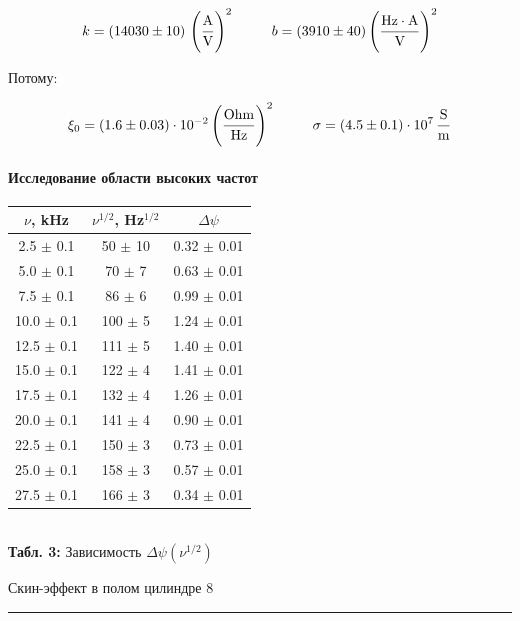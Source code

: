 \documentclass[12pt,a4paper]{scrartcl}
\begin{document}
	$$k = (14030 \pm 10)\, \left(\dfrac{\strut \text{A}}{\strut \text{V}}\right)^2 \ \ \ \ \ \ \ \ b = (3910 \pm 40) \left(\dfrac{\strut \text{Hz} \cdot \text{A}}{\strut \text{V}}\right)^2$$
	
	Потому:
	
	$$\xi_0 = (1.6 \pm 0.03) \cdot 10^{-2} \left(\dfrac{\strut \text{Ohm}}{\strut \text{Hz}}\right)^2 \ \ \ \ \ \ \ \ \sigma = (4.5 \pm 0.1) \cdot 10^7\,\dfrac{\strut \text{S}}{\strut \text{m}}$$
	
	
	\paragraph{Исследование области высоких частот} \hfill
	
	\begin{center}
		\begin{tabular}{|c|c|c|}
			\hline
			$\nu$, kHz & $\nu^{1/2}$, Hz$^{1/2}$ & $\Delta \psi$
			\\\hline
			2.5 $\pm$ 0.1 & 50 $\pm$ 10 & 0.32 $\pm$ 0.01
			\\\hline
			5.0 $\pm$ 0.1 & 70 $\pm$ 7 & 0.63 $\pm$ 0.01
			\\\hline
			7.5 $\pm$ 0.1 & 86 $\pm$ 6 & 0.99 $\pm$ 0.01
			\\\hline
			10.0 $\pm$ 0.1 & 100 $\pm$ 5 & 1.24 $\pm$ 0.01
			\\\hline
			12.5 $\pm$ 0.1 & 111 $\pm$ 5 & 1.40 $\pm$ 0.01
			\\\hline
			15.0 $\pm$ 0.1 & 122 $\pm$ 4 & 1.41 $\pm$ 0.01
			\\\hline
			17.5 $\pm$ 0.1 & 132 $\pm$ 4 & 1.26 $\pm$ 0.01
			\\\hline
			20.0 $\pm$ 0.1 & 141 $\pm$ 4 & 0.90 $\pm$ 0.01
			\\\hline
			22.5 $\pm$ 0.1 & 150 $\pm$ 3 & 0.73 $\pm$ 0.01
			\\\hline
			25.0 $\pm$ 0.1 & 158 $\pm$ 3 & 0.57 $\pm$ 0.01
			\\\hline
			27.5 $\pm$ 0.1 & 166 $\pm$ 3 & 0.34 $\pm$ 0.01
			\\\hline
		\end{tabular}
		\\\textbf{Табл. 3:} Зависимость $\Delta \psi(\nu^{1/2})$
	\end{center}
	
	
	\newpage
	
	\begin{flushleft}
		\footnotesize{Скин-эффект в полом цилиндре} \hspace{\fill} \footnotesize{8}
		\\[-0.3cm]\noindent\rule{\textwidth}{0.3pt}
	\end{flushleft}
	
\end{document}
